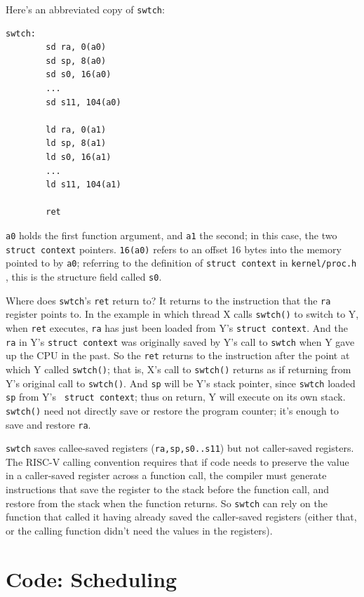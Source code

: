 Here's an abbreviated copy of {\tt swtch}:

\begin{verbatim}
swtch:
        sd ra, 0(a0)
        sd sp, 8(a0)
        sd s0, 16(a0)
        ...
        sd s11, 104(a0)

        ld ra, 0(a1)
        ld sp, 8(a1)
        ld s0, 16(a1)
        ...
        ld s11, 104(a1)
        
        ret
\end{verbatim}

{\tt a0} holds the first function argument, and {\tt a1} the second;
in this case, the two {\tt struct context} pointers.
{\tt 16(a0)} refers to an offset 16 bytes into the memory
pointed to by {\tt a0}; referring
to the definition of {\tt struct context} in {\tt kernel/proc.h}
,
this is the structure field called {\tt s0}.

Where does {\tt swtch}'s {\tt ret} return to? It returns to the
instruction that the {\tt ra} register points to. In the example in
which thread X calls {\tt swtch()} to switch to Y, when {\tt ret}
executes, {\tt ra} has just been loaded from Y's {\tt struct context}.
And the {\tt ra} in Y's {\tt struct context} was originally saved by
Y's call to {\tt swtch} when Y gave up the CPU in the past. So the
{\tt ret} returns to the instruction after the point at which Y called
{\tt swtch()}; that is, X's call to {\tt swtch()} returns as if
returning from Y's original call to {\tt swtch()}. And {\tt sp} will
be Y's stack pointer, since {\tt swtch} loaded {\tt sp} from Y's {\tt
  struct context}; thus on return, Y will execute on its own stack.
{\tt swtch()} need not directly save or restore the program counter;
it's enough to save and restore {\tt ra}.

\lstinline{swtch}
saves callee-saved registers ({\tt ra,sp,s0..s11}) but not caller-saved registers.
The RISC-V calling convention requires that if code needs to
preserve the value in a caller-saved register across a function
call, the compiler must generate instructions
that save the register to the stack before the function call,
and restore from the stack when the
function returns. So \lstinline{swtch} can rely on the function that
called it having already saved the caller-saved registers (either
that, or the calling function didn't need the values in the
registers).

\section{Code: Scheduling}

